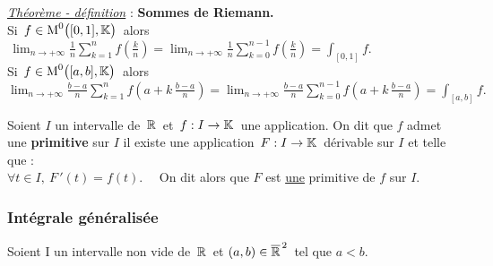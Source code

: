 \vspace{1cm}

\underline{\emph{Théorème - définition}} : \textbf{Sommes de Riemann.}\vspace{0.1cm}\\
Si \(\,f\in \text{M}^0\bigl([0,1],\mathbb{K}\bigr)\,\) alors \(\,\displaystyle \lim_{n\to +\infty}\frac{1}{n}\sum_{k=1}^{n}f\!\left(\frac{k}{n}\right)=\lim_{n\to +\infty}\frac{1}{n}\sum_{k=0}^{n-1}f\!\left(\frac{k}{n}\right)=\int_{[0,1]}f.\)\vspace{0.3cm}\\
Si \(\,f\in \text{M}^0\bigl([a,b],\mathbb{K}\bigr)\,\) alors \(\displaystyle \lim_{n\to +\infty}\frac{b-a}{n}\sum_{k=1}^{n}f\!\left(a+k\,\frac{b-a}{n}\right)=\lim_{n\to +\infty}\frac{b-a}{n}\sum_{k=0}^{n-1}f\!\left(a+k\,\frac{b-a}{n}\right)=\int_{[a,b]}f.\)

\vspace{1.5cm}

Soient $I$ un intervalle de \(\,\mathbb{R}\,\) et \(\,f:I\to \mathbb{K}\,\) une application. On dit que $f$ admet une \textbf{primitive} sur $I$ \ssi il existe une application \(\,F:I\to \mathbb{K}\,\) dérivable sur $I$ et telle que : \vspace{0.1cm}\\
\(\forall t\in I,\ F\,'(t)=f(t).\quad \) On dit alors que $F$ est \underline{une} primitive de $f$ sur $I$.

\newpage

\subsubsection{Intégrale généralisée}

\vspace{0.8cm}

\begin{center}
    Soient I un intervalle non vide de \(\,\mathbb{R}\,\) et \((a,b)\in \overline{\mathbb{R}}^{\,2}\,\) tel que $a<b$.
\end{center}

\vspace{0.7cm}

